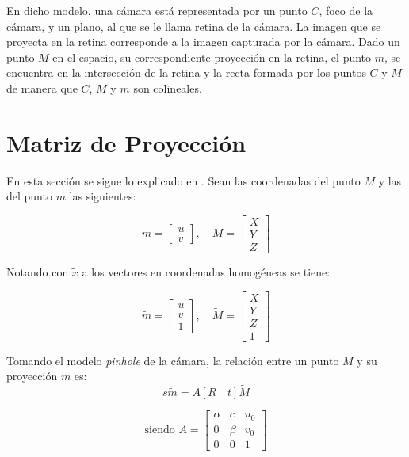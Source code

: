 En dicho modelo, una cámara está representada por un punto $C$, foco de la cámara, y un plano, al  que se le llama retina de la cámara. La imagen que se proyecta en la retina corresponde a la imagen capturada por la cámara. Dado un punto $M$ en el espacio, su correspondiente proyección en la retina, el punto $m$, se encuentra en la intersección de la retina y la recta formada por los puntos $C$ y $M$ de manera que $C$, $M$ y $m$ son colineales. 

\section{Matriz de Proyección}
\label{matriz_de_proyeccion}

En esta sección se sigue lo explicado en \cite{zhang_libro}. Sean las coordenadas del punto  $M$ y las del punto $m$ las siguientes:


\[m = \begin{bmatrix}
u \\ 
v
\end{bmatrix} , \quad
M = \begin{bmatrix}
X \\ 
Y \\
Z
\end{bmatrix} \]

\hspace{-0.6cm}Notando con $\tilde{x}$ a los vectores en coordenadas homogéneas se tiene:


\[\tilde{m} = \begin{bmatrix}
u \\ 
v \\
1
\end{bmatrix} , \quad
\tilde{M} = \begin{bmatrix}
X \\ 
Y \\
Z \\
1
\end{bmatrix} \]

Tomando el modelo \textit{pinhole} de la cámara, la relación entre un punto $M$ y su proyección $m$ es:
\begin{equation}
s\tilde{m} = A [R \quad t]\tilde{M}
\label{proyeccion}
\end{equation}


\begin{equation}
\text{siendo }
A = \begin{bmatrix}
\alpha & c & u_0 \\ 
0 & \beta & v_0 \\ 
0 & 0 & 1
\end{bmatrix} 
\end{equation}

